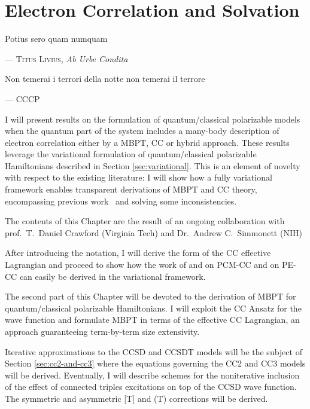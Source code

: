 \chapter{Electron Correlation and Solvation}\label{ch:solvation-correlation}

\epigraph{Potius sero quam numquam}{--- \textsc{Titus Livius}, \textit{Ab Urbe Condita}}
\epigraph{Non temerai i terrori della notte non temerai il terrore}{--- \textsc{CCCP}}

I will present results on the formulation of quantum/classical
polarizable models when the quantum part of the system includes a
many-body description of electron correlation either by a \ac{MBPT},
\ac{CC} or hybrid approach.
These results leverage the variational formulation of quantum/classical
polarizable Hamiltonians described in Section \ref{sec:variational}.
This is an element of novelty with respect to the existing literature: I
will show how a fully variational framework enables transparent
derivations of \acs{MBPT} and \acs{CC} theory, encompassing previous
work~\cite{Cammi, Olivares del Valle, Caricato, Sneskov}
and solving some inconsistencies.~\cite{Angyan1992}

The contents of this Chapter are the result of an ongoing collaboration
with prof.~T.~Daniel Crawford (Virginia Tech) and Dr.~Andrew
C.~Simmonett (NIH)

After introducing the notation, I will derive the form of the \acs{CC}
effective Lagrangian and proceed to show how the work of
\citeauthor{Cammi2009-gu} and \citeauthor{Caricato2011-tx} on
\acs{PCM}-\acs{CC} and \citeauthor{Sneskov} on \acs{PE}-\acs{CC}
can easily be derived in the variational framework.

The second part of this Chapter will be devoted to the derivation of
\acs{MBPT} for quantum/classical polarizable Hamiltonians.
I will exploit the \acs{CC} Ansatz for the wave function and formulate
\acs{MBPT} in terms of the effective \acs{CC} Lagrangian, an approach
guaranteeing term-by-term size extensivity.

Iterative approximations to the \acs{CCSD} and \acs{CCSDT} models will
be the subject of Section \ref{sec:cc2-and-cc3} where the equations
governing the \acs{CC2} and \acs{CC3} models will be derived.
Eventually, I will describe schemes for the noniterative inclusion of
the effect of connected triples excitations on top of
the \acs{CCSD} wave function. The symmetric and asymmetric [T] and (T)
corrections will be derived.

